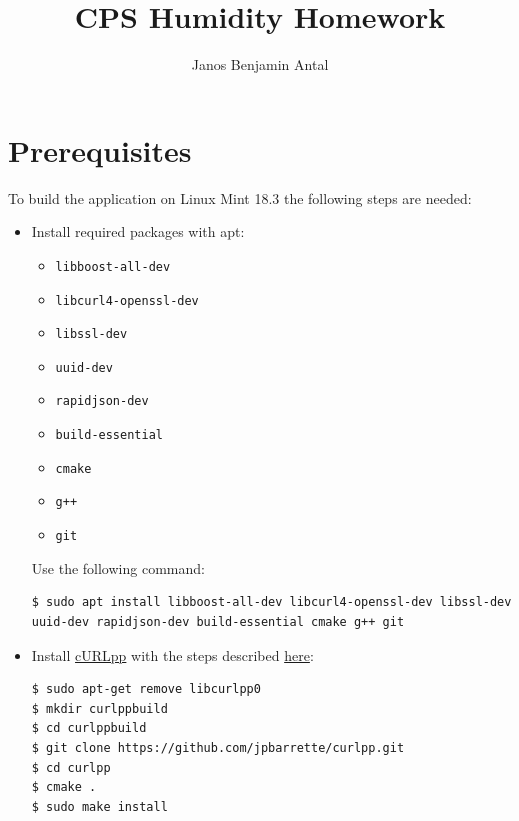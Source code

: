 \documentclass{article}
\author{Janos Benjamin Antal}
\title{CPS Humidity Homework}
\begin{document}
\maketitle
\section{Prerequisites}
To build the application on Linux Mint 18.3 the following steps are needed:

\begin{itemize}
\item Install required packages with apt: 
\begin{itemize}
\item \verb+libboost-all-dev+
\item \verb+libcurl4-openssl-dev+
\item \verb+libssl-dev+ %
\item \verb+uuid-dev+
\item \verb+rapidjson-dev+
\item \verb+build-essential+
\item \verb+cmake+
\item \verb!g++!
\item \verb+git+
\end{itemize}
Use the following command:
\begin{lstlisting}
$ sudo apt install libboost-all-dev libcurl4-openssl-dev libssl-dev uuid-dev rapidjson-dev build-essential cmake g++ git
\end{lstlisting}
\item Install \href{http://www.curlpp.org/}{cURLpp} with the steps described \href{https://github.com/beniz/deepdetect/issues/126}{here}:
\begin{verbatim}
$ sudo apt-get remove libcurlpp0
$ mkdir curlppbuild
$ cd curlppbuild
$ git clone https://github.com/jpbarrette/curlpp.git
$ cd curlpp
$ cmake .
$ sudo make install
\end{verbatim} 

\end{itemize}
\end{document}

